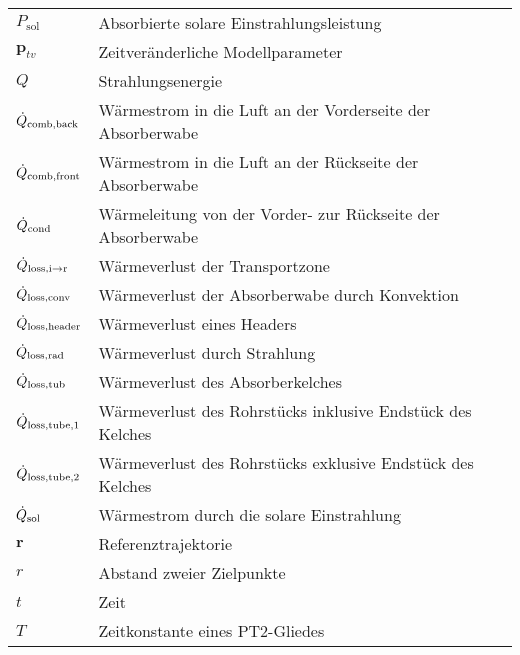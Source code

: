 \begin{longtable}{p{}p{}}
    $P_{\mathrm{sol}}$               & Absorbierte solare Einstrahlungsleistung                         \\
    $\boldsymbol{p}_{tv}$            & Zeitveränderliche Modellparameter                                \\
    $Q$                              & Strahlungsenergie                                                \\
    $\dot{Q}_{\mathrm{comb,back}}$          & Wärmestrom in die Luft an der Vorderseite der Absorberwabe       \\
    $\dot{Q}_{\mathrm{comb,front}}$         & Wärmestrom in die Luft an der Rückseite der Absorberwabe         \\
    $\dot{Q}_{\mathrm{cond}}$                & Wärmeleitung von der Vorder- zur Rückseite der Absorberwabe      \\
    $\dot{Q}_{\mathrm{loss,i \to r}}$   & Wärmeverlust der Transportzone                                   \\
    $\dot{Q}_{\mathrm{loss,conv}}$ & Wärmeverlust der Absorberwabe durch Konvektion                   \\
    $\dot{Q}_{\mathrm{loss,header}}$              & Wärmeverlust eines Headers                                       \\
    $\dot{Q}_{\mathrm{loss,rad}}$  & Wärmeverlust durch Strahlung                                     \\
    $\dot{Q}_{\mathrm{loss,tub}}$                 & Wärmeverlust des Absorberkelches                                 \\
    $\dot{Q}_{\mathrm{loss,tube,1}}$              & Wärmeverlust des Rohrstücks inklusive Endstück des Kelches       \\
    $\dot{Q}_{\mathrm{loss,tube,2}}$              & Wärmeverlust des Rohrstücks exklusive Endstück des Kelches       \\
    $\dot{Q}_{\mathrm{sol}}$                       & Wärmestrom durch die solare Einstrahlung                         \\
    $\boldsymbol{r}$                 & Referenztrajektorie                                              \\
    $r$                              & Abstand zweier Zielpunkte                                        \\
    $t$                              & Zeit                                                             \\
    $T$                              & Zeitkonstante eines PT2-Gliedes                                  \\

\end{longtable}
